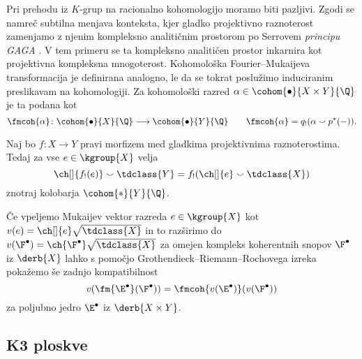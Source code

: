 Pri prehodu iz $K$-grup na racionalno kohomologijo moramo biti pazljivi. Zgodi se namreč subtilna menjava konteksta, kjer gladko projektivno raznoterost zamenjamo z njenim kompleksno analitičnim prostorom po Serrovem \emph{principu GAGA} \cite{Serre1956}. V tem primeru se ta kompleksno analitičen prostor inkarnira kot projektivna kompleksna mnogoterost. Kohomološka Fourier--Mukaijeva transformacija je definirana analogno, le da se tokrat poslužimo induciranim preslikavam na kohomologiji. Za kohomološki razred $\alpha \in \cohom{\bullet}{X \times Y}{\Q}$ je ta podana kot
\[
    \fmcoh{\alpha} \colon \cohom{\bullet}{X}{\Q} \longrightarrow \cohom{\bullet}{Y}{\Q} \qquad \fmcoh{\alpha} = q_!(\alpha \smallsmile p^*(-)).
\]

\begin{izrek}
    Naj bo $f \colon X \to Y$ pravi morfizem med gladkima projektivnima raznoterostima. Tedaj za vse $e \in \kgroup{X}$ velja
    \begin{equation}
        \ch[]{f_!(e)} \smallsmile \tdclass{Y} = f_!(\ch[]{e} \smallsmile \tdclass{X})
    \end{equation}
    znotraj kolobarja $\cohom{*}{Y}{\Q}$.
\end{izrek}

Če vpeljemo Mukaijev vektor razreda $e \in \kgroup{X}$ kot $v(e) = \ch[]{e}\sqrt{\tdclass{X}}$ in to razširimo do $v(\F^\bullet) = \ch{\F^\bullet}\sqrt{\tdclass{X}}$ za omejen kompleks koherentnih snopov $\F^\bullet$ iz $\derb{X}$ lahko s pomočjo Grothendieck--Riemann--Rochovega izreka pokažemo še zadnjo kompatibilnost
\[
    v(\fm{\E^\bullet}(\F^\bullet)) = \fmcoh{v(\E^\bullet)}(v(\F^\bullet))
\]
za poljubno jedro $\E^\bullet$ iz $\derb{X \times Y}$.

\subsection*{K3 ploskve}

